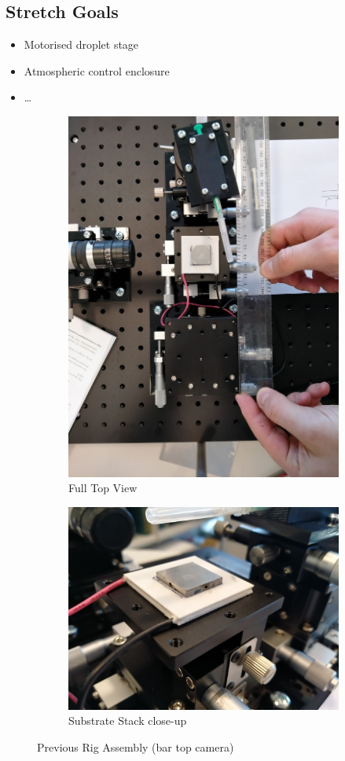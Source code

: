\documentclass[11pt, a4paper, twoside, openright]{report}
\begin{document}
\subsection{Stretch Goals}
\begin{itemize}
  \item Motorised droplet stage
  \item Atmospheric control enclosure
  \item \dots
\end{itemize}

\begin{figure}
  \begin{subfigure}{.5\textwidth}
    \centering
    \includegraphics[height=.75\linewidth]{Figures/Full_rig_top.jpg}
    \caption{Full Top View}
  \end{subfigure}%
  \begin{subfigure}{.5\textwidth}
    \centering
    \includegraphics[height=.75\linewidth]{Figures/substrate_stack.jpg}
    \caption{Substrate Stack close-up}
  \end{subfigure}
  \caption{Previous Rig Assembly (bar top camera)}
  \label{fig::old_rig}
  \end{figure}
\end{document}
